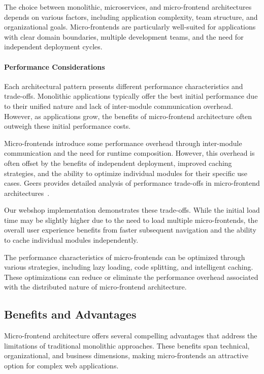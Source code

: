 \documentclass[12pt,a4paper]{report}
\begin{document}
The choice between monolithic, microservices, and micro-frontend architectures depends on various factors, including application complexity, team structure, and organizational goals. Micro-frontends are particularly well-suited for applications with clear domain boundaries, multiple development teams, and the need for independent deployment cycles.

\paragraph{Performance Considerations}

Each architectural pattern presents different performance characteristics and trade-offs. Monolithic applications typically offer the best initial performance due to their unified nature and lack of inter-module communication overhead. However, as applications grow, the benefits of micro-frontend architecture often outweigh these initial performance costs.

Micro-frontends introduce some performance overhead through inter-module communication and the need for runtime composition. However, this overhead is often offset by the benefits of independent deployment, improved caching strategies, and the ability to optimize individual modules for their specific use cases. Geers provides detailed analysis of performance trade-offs in micro-frontend architectures~\cite{geers2019microfrontends}.

Our webshop implementation demonstrates these trade-offs. While the initial load time may be slightly higher due to the need to load multiple micro-frontends, the overall user experience benefits from faster subsequent navigation and the ability to cache individual modules independently.

The performance characteristics of micro-frontends can be optimized through various strategies, including lazy loading, code splitting, and intelligent caching. These optimizations can reduce or eliminate the performance overhead associated with the distributed nature of micro-frontend architecture.
\subsection{Benefits and Advantages}

Micro-frontend architecture offers several compelling advantages that address the limitations of traditional monolithic approaches. These benefits span technical, organizational, and business dimensions, making micro-frontends an attractive option for complex web applications.
\end{document}
